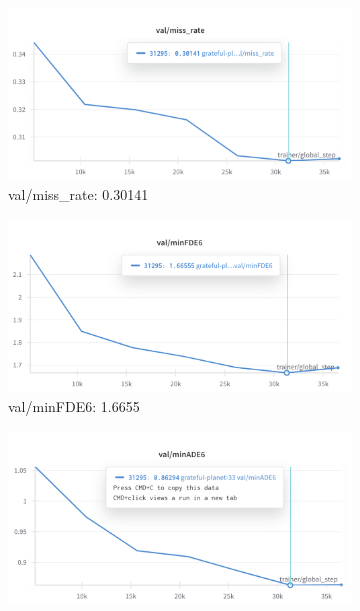 \begin{figure}[htbp]
    \centering
    \begin{subfigure}[b]{0.48\textwidth}
        \centering
        \includegraphics[clip, width=\textwidth]{figures/val_miss_rate.png}
        \caption{val/miss\_rate: 0.30141}
    \end{subfigure}
    \hfill
    \begin{subfigure}[b]{0.48\textwidth}
        \centering
        \includegraphics[clip, width=\textwidth]{figures/val_min_fde6.png}
        \caption{val/minFDE6: 1.6655}
    \end{subfigure}
    \vfill
    \begin{subfigure}[b]{0.48\textwidth}
        \centering
        \includegraphics[clip, width=\textwidth]{figures/val_min_ade6.png}

\end{subfigure}
\end{figure}

